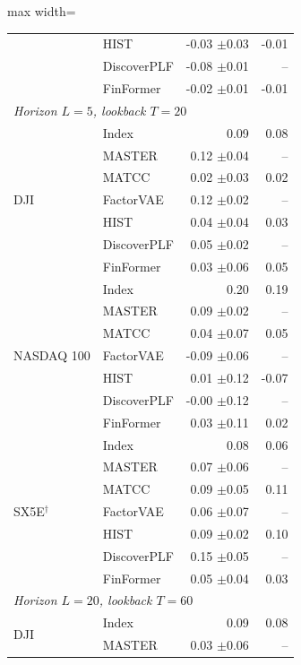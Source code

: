 \begin{table}[tb]
\begin{adjustbox}{max width=\textwidth}
{\begin{tabular}{llrr}
 & HIST & -0.03 {\scriptsize$\pm$0.03} & -0.01 \\
 & DiscoverPLF & -0.08 {\scriptsize$\pm$0.01} & -- \\
 & FinFormer & -0.02 {\scriptsize$\pm$0.01} & -0.01 \\
\midrule
\multicolumn{4}{l}{\textit{Horizon $L=5$, lookback $T=20$}} \\
\multirow{7}{*}{DJI} & Index & 0.09 & 0.08 \\
 & MASTER & 0.12 {\scriptsize$\pm$0.04} & -- \\
 & MATCC & 0.02 {\scriptsize$\pm$0.03} & 0.02 \\
 & FactorVAE & 0.12 {\scriptsize$\pm$0.02} & -- \\
 & HIST & 0.04 {\scriptsize$\pm$0.04} & 0.03 \\
 & DiscoverPLF & 0.05 {\scriptsize$\pm$0.02} & -- \\
 & FinFormer & 0.03 {\scriptsize$\pm$0.06} & 0.05 \\
\midrule
\multirow{7}{*}{NASDAQ 100} & Index & 0.20 & 0.19 \\
 & MASTER & 0.09 {\scriptsize$\pm$0.02} & -- \\
 & MATCC & 0.04 {\scriptsize$\pm$0.07} & 0.05 \\
 & FactorVAE & -0.09 {\scriptsize$\pm$0.06} & -- \\
 & HIST & 0.01 {\scriptsize$\pm$0.12} & -0.07 \\
 & DiscoverPLF & -0.00 {\scriptsize$\pm$0.12} & -- \\
 & FinFormer & 0.03 {\scriptsize$\pm$0.11} & 0.02 \\
\midrule
\multirow{7}{*}{SX5E$^\dagger$} & Index & 0.08 & 0.06 \\
 & MASTER & 0.07 {\scriptsize$\pm$0.06} & -- \\
 & MATCC & 0.09 {\scriptsize$\pm$0.05} & 0.11 \\
 & FactorVAE & 0.06 {\scriptsize$\pm$0.07} & -- \\
 & HIST & 0.09 {\scriptsize$\pm$0.02} & 0.10 \\
 & DiscoverPLF & 0.15 {\scriptsize$\pm$0.05} & -- \\
 & FinFormer & 0.05 {\scriptsize$\pm$0.04} & 0.03 \\
\midrule
\multicolumn{4}{l}{\textit{Horizon $L=20$, lookback $T=60$}} \\
\multirow{7}{*}{DJI} & Index & 0.09 & 0.08 \\
 & MASTER & 0.03 {\scriptsize$\pm$0.06} & -- \\

\end{tabular}}
\end{adjustbox}
\end{table}
